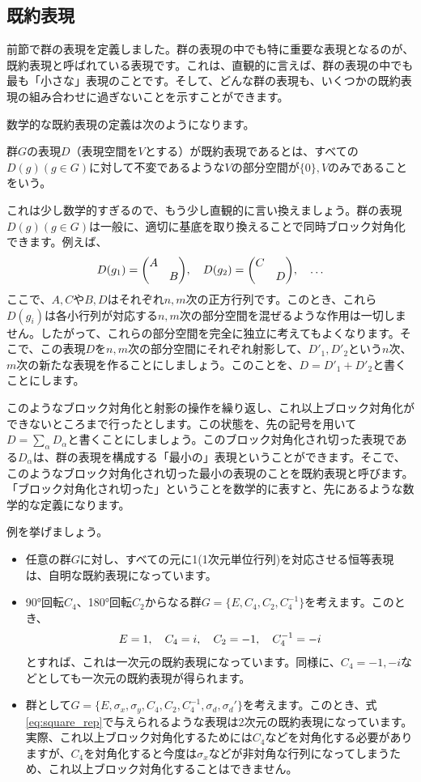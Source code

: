 \documentclass[uplatex,dvipdfmx,a4j,openany]{jsarticle}
\begin{document}
\subsection{既約表現}
前節で群の表現を定義しました。群の表現の中でも特に重要な表現となるのが、既約表現と呼ばれている表現です。これは、直観的に言えば、群の表現の中でも最も「小さな」表現のことです。そして、どんな群の表現も、いくつかの既約表現の組み合わせに過ぎないことを示すことができます。

数学的な既約表現の定義は次のようになります。
\begin{tcolorbox}[title=定義：群の既約表現]
	群$G$の表現$D$（表現空間を$V$とする）が既約表現であるとは、すべての$D(g) (g\in G)$に対して不変であるような$V$の部分空間が$\{0\},V$のみであることをいう。 
\end{tcolorbox}
これは少し数学的すぎるので、もう少し直観的に言い換えましょう。群の表現$D(g) (g \in G)$は一般に、適切に基底を取り換えることで同時ブロック対角化できます。例えば、
\begin{align}
	D(g_1) = \mqty(\dmat{A, B}) \qc D(g_2) = \mqty(\dmat{C, D})\qc \dots
\end{align}
ここで、$A,C$や$B,D$はそれぞれ$n, m$次の正方行列です。このとき、これら$D(g_i)$は各小行列が対応する$n,m$次の部分空間を混ぜるような作用は一切しません。したがって、これらの部分空間を完全に独立に考えてもよくなります。そこで、この表現$D$を$n,m$次の部分空間にそれぞれ射影して、$D'_1, D'_2$という$n$次、$m$次の新たな表現を作ることにしましょう。このことを、$D = D'_1 + D'_2$と書くことにします。

このようなブロック対角化と射影の操作を繰り返し、これ以上ブロック対角化ができないところまで行ったとします。この状態を、先の記号を用いて$D = \sum_\alpha D_\alpha$と書くことにしましょう。このブロック対角化され切った表現である$D_\alpha$は、群の表現を構成する「最小の」表現ということができます。そこで、このようなブロック対角化され切った最小の表現のことを既約表現と呼びます。「ブロック対角化され切った」ということを数学的に表すと、先にあるような数学的な定義になります。

例を挙げましょう。
\begin{itemize}
	\item 任意の群$G$に対し、すべての元に1(1次元単位行列)を対応させる恒等表現は、自明な既約表現になっています。
	\item 90°回転$C_4$、180°回転$C_2$からなる群$G = \{E, C_4, C_2, C_4^{-1}\}$を考えます。このとき、\begin{align}
		E = 1 \qc C_4 = i \qc C_2 = -1 \qc C_4^{-1} = -i
	\end{align}
	とすれば、これは一次元の既約表現になっています。同様に、$C_4 = -1, -i$などとしても一次元の既約表現が得られます。
	\item 群として$G = \{ E, \sigma_x, \sigma_y, C_4, C_2, C_4^{-1}, \sigma_d, \sigma_d'\}$を考えます。このとき、式\eqref{eq:square_rep}で与えられるような表現は2次元の既約表現になっています。実際、これ以上ブロック対角化するためには$C_4$などを対角化する必要がありますが、$C_4$を対角化すると今度は$\sigma_x$などが非対角な行列になってしまうため、これ以上ブロック対角化することはできません。
\end{itemize}
\end{document}
